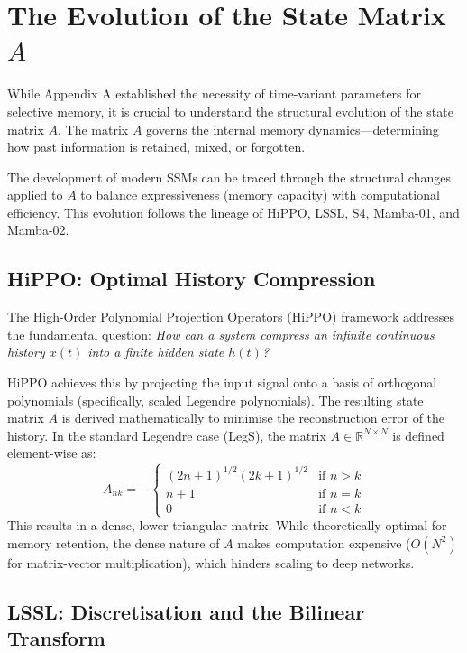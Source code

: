 \documentclass[a4paper,11pt]{article}
\begin{document}
\section{The Evolution of the State Matrix $A$}

While Appendix A established the necessity of time-variant parameters for selective memory, it is crucial to understand the structural evolution of the state matrix $A$. The matrix $A$ governs the internal memory dynamics—determining how past information is retained, mixed, or forgotten.

The development of modern SSMs can be traced through the structural changes applied to $A$ to balance expressiveness (memory capacity) with computational efficiency. This evolution follows the lineage of HiPPO, LSSL, S4, Mamba-01, and Mamba-02.

\subsection{HiPPO: Optimal History Compression}

The High-Order Polynomial Projection Operators (HiPPO) framework addresses the fundamental question: \textit{How can a system compress an infinite continuous history $x(t)$ into a finite hidden state $h(t)$?}

HiPPO achieves this by projecting the input signal onto a basis of orthogonal polynomials (specifically, scaled Legendre polynomials). The resulting state matrix $A$ is derived mathematically to minimise the reconstruction error of the history. In the standard Legendre case (LegS), the matrix $A \in \mathbb{R}^{N \times N}$ is defined element-wise as:
\begin{equation}
    A_{nk} = - \begin{cases}
        (2n+1)^{1/2}(2k+1)^{1/2} & \text{if } n > k \\
        n+1 & \text{if } n = k \\
        0 & \text{if } n < k
    \end{cases}
\end{equation}
This results in a dense, lower-triangular matrix. While theoretically optimal for memory retention, the dense nature of $A$ makes computation expensive ($O(N^2)$ for matrix-vector multiplication), which hinders scaling to deep networks.

\subsection{LSSL: Discretisation and the Bilinear Transform}
\end{document}
